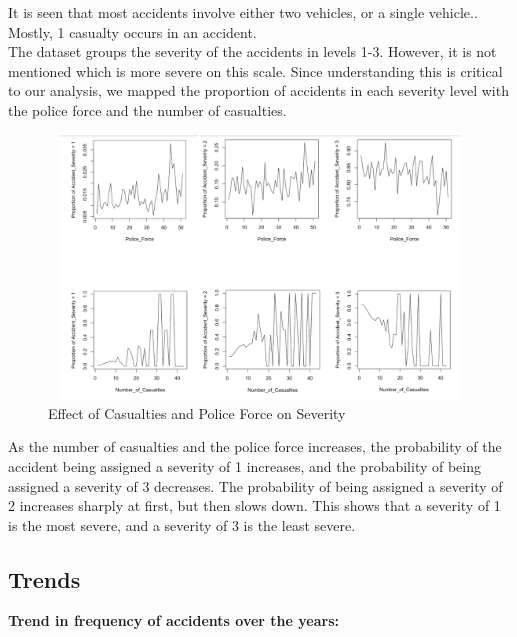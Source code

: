 \documentclass[a4paper, 10pt]{article}
\begin{document}
  It is seen that most accidents involve either two vehicles, or a single vehicle.. Mostly, 1 casualty occurs in an accident. \\

    The dataset groups the severity of the accidents in levels 1-3. However, it is not mentioned which is more severe on this scale. Since understanding this is critical to our analysis, we mapped the proportion of accidents in each severity level with the police force and the number of casualties. \\
\newline

\begin{figure} [H]
   \begin{center}
   \caption{Effect of Casualties and Police Force on Severity}
     \includegraphics[width=70cm,height=7cm, scale=0.6,keepaspectratio]{severity-analysis.png}
   \end{center}
\end{figure}

As the number of casualties and the police force increases, the probability of the accident being assigned a severity of 1 increases, and the probability of being assigned a severity of 3 decreases. The probability of being assigned a severity of 2 increases sharply at first, but then slows down. This shows that a severity of 1 is the most severe, and a severity of 3 is the least severe. \\

 \subsection{Trends}
   
   \textbf{Trend in frequency of accidents over the years:}
\end{document}
